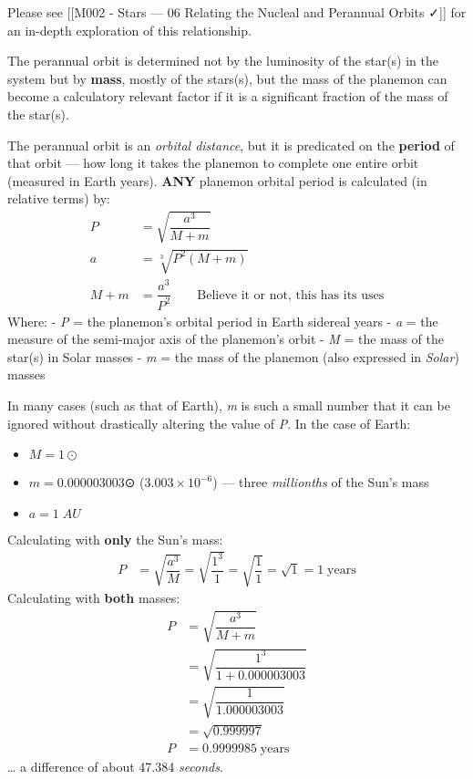 \documentclass[
  letterpaper,
]{book}
\providecommand{\tightlist}{%
  \setlength{\itemsep}{0pt}\setlength{\parskip}{0pt}}
\begin{document}
Please see {[}{[}M002 - Stars --- 06 Relating the Nucleal and Perannual
Orbits ✓{]}{]} for an in-depth exploration of this relationship.

The perannual orbit is determined not by the luminosity of the star(s)
in the system but by \textbf{mass}, mostly of the stars(s), but the mass
of the planemon can become a calculatory relevant factor if it is a
significant fraction of the mass of the star(s).

The perannual orbit is an \emph{orbital distance}, but it is predicated
on the \textbf{period} of that orbit --- how long it takes the planemon
to complete one entire orbit (measured in Earth years). \textbf{ANY}
planemon orbital period is calculated (in relative terms) by: \[
\begin{align}
    P &= \sqrt{\dfrac{a^3}{M+m}} \\
    a &= \sqrt[3]{P^2 (M+m)} \\
    M + m &= \dfrac{a^3}{P^2} \qquad \text{Believe it or not, this has its uses}
\end{align}
\] Where: - \emph{P} = the planemon's orbital period in Earth sidereal
years - \emph{a} = the measure of the semi-major axis of the planemon's
orbit - \emph{M} = the mass of the star(s) in Solar masses - \emph{m} =
the mass of the planemon (also expressed in \emph{Solar}) masses

In many cases (such as that of Earth), \emph{m} is such a small number
that it can be ignored without drastically altering the value of
\emph{P}. In the case of Earth:

\begin{itemize}
\tightlist
\item
  \(M = 1⊙\)
\item
  \(m = 0.000003003\)⊙ (\(3.003 \times 10^{-6}\)) --- three
  \emph{millionths} of the Sun's mass
\item
  \(a = 1\;AU\)
\end{itemize}

Calculating with \textbf{only} the Sun's mass: \[
\begin{align}
    P &= \sqrt{\dfrac{a^3}{M}} = \sqrt{\dfrac{1^3}{1}} = \sqrt{\dfrac{1}{1}} = \sqrt{1} = 1\;\text{years}       
\end{align}
\] Calculating with \textbf{both} masses: \[
\begin{align}
    P &= \sqrt{\dfrac{a^3}{M + m}} \\
     &= \sqrt{\dfrac{1^3}{1 + 0.000003003}} \\
     &= \sqrt{\dfrac{1}{1.000003003}} \\
     &= \sqrt{0.999997} \\
     P &= 0.9999985\;\text{years}       
\end{align}
\] \ldots{} a difference of about 47.384 \emph{seconds}.
\end{document}
